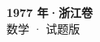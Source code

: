 \documentclass[zihao=-4, a4paper]{ctexart}
\begin{document}
\begin{center}
  {\Large\bfseries 1977 年·浙江卷}\\[4pt]
  {\large 数学 · 试题版}
\end{center}
\medskip
{}

\end{document}
